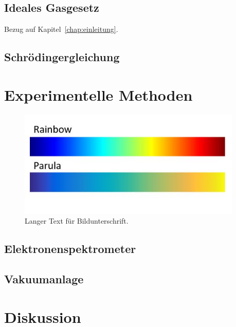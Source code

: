 \documentclass[fontsize=11pt,%
twoside,%
BCOR          = 8mm, %
DIV           = 11,  %
titlepage     = off,%
index=totoc,%
xcolor        = pdftex,%
dvipsnames,%
bibliography  = totoc,%
listof        = notnumbered]{scrreprt}
\begin{document}
\section{Ideales Gasgesetz}\label{sec:idealesgas}
Bezug auf Kapitel~\ref{chap:einleitung}.
\blindtext
\blindtext\cite{Scholze2008}\cite{Susskind2014}\cite{Maskin1985}\cite{Aggaewal2006}\cite{Aarrow1948}\cite{Fudenberg1988}
\blindmathpaper
\Blindtext

\section{Schr\"{o}dingergleichung}\label{sec:schroedinger}
\blindtext
\cleardoublepage

\chapter{Experimentelle Methoden}\label{chap:experiment}
\Blindtext
\begin{figure}
\centering
\includegraphics[width=0.95\textwidth]{beispielbild.jpg}
\caption[Kurze Bildunterschrift für Abbildungsverzeichnis]{Langer Text für Bildunterschrift. \blindtext}
\label{fig:abbildung1}
\end{figure}

\section{Elektronenspektrometer}\label{sec:electronenspectrometer}
\blindtext

\section{Vakuumanlage}\label{sec:vakuumanlage}
\blindtext
\cleardoublepage

\chapter{Diskussion}\label{chap:diskussion}
\end{document}

